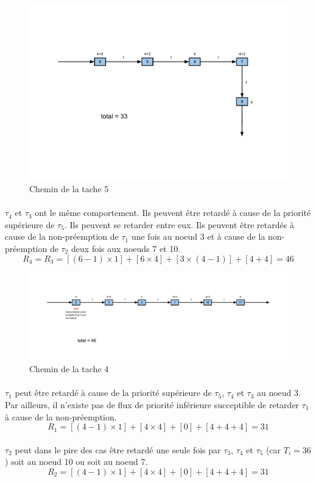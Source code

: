 \documentclass[10pt,a4paper]{article}
\newenvironment{figureH} {%
\begin{figure}[H]
}{%
\end{figure}
}
\begin{document}
\begin{figureH}
  \includegraphics[width=\textwidth]{images/tache5.pdf}
  \center
  \caption{Chemin de la tache 5}
  \label{image_global}
\end{figureH}

\paragraph{}
$\tau_4$ et $\tau_3$ ont le même comportement. Ils peuvent être retardé à cause de la priorité supérieure de $\tau_5$. Ils peuvent se retarder entre eux. Ils peuvent être retardés à cause de la non-préemption de $\tau_1$ une fois au noeud 3 et à cause de la non-préemption de $\tau_2$ deux fois aux noeuds 7 et 10.
\[ R_{4} = R_3 = [(6-1) \times 1] +[ 6 \times 4] +[ 3 \times (4-1) ]+[ 4 + 4] = 46 \]

\begin{figureH}
  \includegraphics[width=\textwidth]{images/tache4.pdf}
  \center
  \caption{Chemin de la tache 4}
        \label{image_global}
\end{figureH}

\paragraph{}
$\tau_1$ peut être retardé à cause de la priorité supérieure de $\tau_5$, $\tau_4$ et $\tau_3$ au noeud 3. Par ailleurs, il n'existe pas de flux de priorité inférieure succeptible de retarder $\tau_1$ à cause de la non-préemption.
\[ R_1 = [(4-1)\times 1 ]+[ 4 \times 4] +[ 0] +[ 4 +4 +4] = 31 \]

\paragraph{}
$\tau_2$ peut dans le pire des cas être retardé une seule fois par $\tau_3$, $\tau_4$ et $\tau_5$ (car $T_i = 36$) soit au noeud 10 ou soit au noeud 7.
\[ R_2 = [(4-1) \times 1 ] + [4 \times 4 ] + [0] + [4+4+4] = 31\]


    
\end{document}
